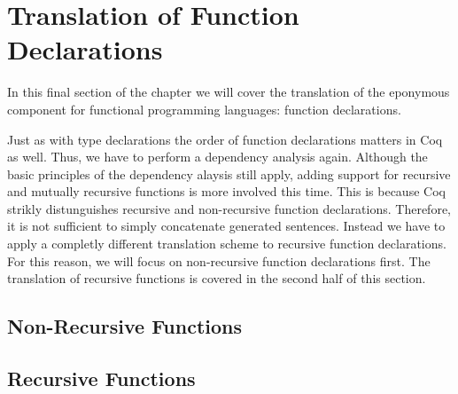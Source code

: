 \section{Translation of Function Declarations} \label{sec:translation:func-decl}
In this final section of the chapter we will cover the translation of the eponymous component for functional programming languages: function declarations.

Just as with type declarations the order of function declarations matters in Coq as well.
Thus, we have to perform a dependency analysis again.
Although the basic principles of the dependency alaysis still apply, adding support for recursive and mutually recursive functions is more involved this time.
This is because Coq strikly distunguishes recursive and non-recursive function declarations.
Therefore, it is not sufficient to simply concatenate generated sentences.
Instead we have to apply a completly different translation scheme to recursive function declarations.
For this reason, we will focus on non-recursive function declarations first.
The translation of recursive functions is covered in the second half of this section.

\subsection{Non-Recursive Functions}
\subsection{Recursive Functions}
